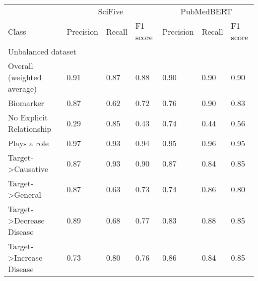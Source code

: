 \documentclass[final,12pt,3p,times,twocolumn,authoryear]{elsarticle}
\begin{document}
\begin{table*}[!t]
    \centering
    \begin{tabular}{|l|l|l|l|l|l|l|}
    \hline
    	& \multicolumn{3}{|c|}{SciFive} & \multicolumn{3}{c|}{PubMedBERT} \\
        Class & Precision & Recall & F1-score & Precision & Recall & F1-score \\ \hline
        \multicolumn{7}{|l|}{Unbalanced dataset}   \\  \hline
         Overall (weighted average) &   0.91 &  0.87  &  0.88 & 0.90 & 0.90 & 0.90 \\
        
        \hspace*{3mm} Biomarker & 0.87 &   0.62 &  0.72 & 0.76 & 0.90 & 0.83\\
        \hspace*{3mm} No Explicit Relationship   &  0.29  &  0.85  & 0.43 & 0.74 & 0.44 & 0.56 \\
        \hspace*{3mm} Plays a role &   0.97   &   0.93  &  0.94 & 0.95 & 0.96 & 0.95 \\
        \hspace*{3mm} Target-\textgreater Causative  & 0.87 & 0.93 &  0.90  & 0.87 & 0.84 & 0.85\\
        \hspace*{3mm} Target-\textgreater General        &  0.87 & 0.63 & 0.73 & 0.74 & 0.86 & 0.80\\
        \hspace*{3mm} Target-\textgreater Decrease Disease & 0.89 &   0.68 &  0.77  & 0.83 & 0.88 & 0.85\\
        \hspace*{3mm} Target-\textgreater Increase Disease   &  0.73   &   0.80   &   0.76 & 0.86 & 0.84 & 0.85\\
        \hline
        

\end{tabular}
\end{table*}
\end{document}
